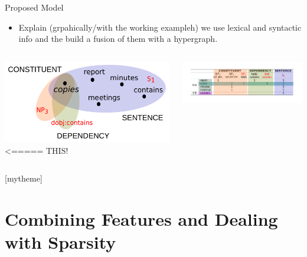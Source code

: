 \documentclass[10pt,xcolor=table]{beamer}
\begin{document}
\begin{frame}{Proposed Model}
	\begin{itemize}
		\item Explain (grpahically/with the working exampleh) we use lexical and syntactic info and the build a fusion of them with a hypergraph.
	\end{itemize}

	\begin{columns}
		\begin{minipage}[c][0.4\textheight][c]{\linewidth}
			 \centering
			 \includegraphics[width=.6\linewidth]{img/hypergraph_copies.pdf} <===== THIS!
		\end{minipage}
		\begin{minipage}[c][0.5\textheight][c]{\linewidth}
			\centering
			\includegraphics[width=.9\linewidth]{img/incidence_aug.pdf}
		\end{minipage}
	\end{columns}
\end{frame}



[mytheme]
\section[Contributions in Detail]{Combining Features and Dealing with Sparsity}                  
\end{document}

